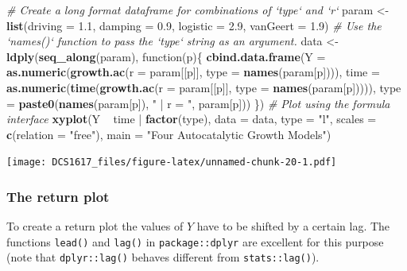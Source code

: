 \documentclass[]{book}
\newenvironment{Shaded}{\begin{snugshade}}{\end{snugshade}}
\newcommand{\KeywordTok}[1]{\textcolor[rgb]{0.13,0.29,0.53}{\textbf{{#1}}}}
\newcommand{\DataTypeTok}[1]{\textcolor[rgb]{0.13,0.29,0.53}{{#1}}}
\newcommand{\FloatTok}[1]{\textcolor[rgb]{0.00,0.00,0.81}{{#1}}}
\newcommand{\StringTok}[1]{\textcolor[rgb]{0.31,0.60,0.02}{{#1}}}
\newcommand{\CommentTok}[1]{\textcolor[rgb]{0.56,0.35,0.01}{\textit{{#1}}}}
\newcommand{\NormalTok}[1]{{#1}}
\begin{document}
\begin{Shaded}
\begin{Highlighting}[]
\CommentTok{# Create a long format dataframe for combinations of `type` and `r`}
\NormalTok{param <-}\StringTok{ }\KeywordTok{list}\NormalTok{(}\DataTypeTok{driving  =} \FloatTok{1.1}\NormalTok{,}
              \DataTypeTok{damping  =} \FloatTok{0.9}\NormalTok{,}
              \DataTypeTok{logistic =} \FloatTok{2.9}\NormalTok{,}
              \DataTypeTok{vanGeert =} \FloatTok{1.9}\NormalTok{)}
\CommentTok{# Use the `names()` function to pass the `type` string as an argument.}
\NormalTok{data <-}\StringTok{ }\KeywordTok{ldply}\NormalTok{(}\KeywordTok{seq_along}\NormalTok{(param), function(p)\{}
    \KeywordTok{cbind.data.frame}\NormalTok{(}\DataTypeTok{Y    =} \KeywordTok{as.numeric}\NormalTok{(}\KeywordTok{growth.ac}\NormalTok{(}\DataTypeTok{r =} \NormalTok{param[[p]], }\DataTypeTok{type =} \KeywordTok{names}\NormalTok{(param[p]))),}
                     \DataTypeTok{time =} \KeywordTok{as.numeric}\NormalTok{(}\KeywordTok{time}\NormalTok{(}\KeywordTok{growth.ac}\NormalTok{(}\DataTypeTok{r =} \NormalTok{param[[p]], }\DataTypeTok{type =} \KeywordTok{names}\NormalTok{(param[p])))),}
                     \DataTypeTok{type =} \KeywordTok{paste0}\NormalTok{(}\KeywordTok{names}\NormalTok{(param[p]), }\StringTok{" | r = "}\NormalTok{, param[p]))}
    \NormalTok{\})}
\CommentTok{# Plot using the formula interface}
\KeywordTok{xyplot}\NormalTok{(Y ~}\StringTok{ }\NormalTok{time |}\StringTok{ }\KeywordTok{factor}\NormalTok{(type), }\DataTypeTok{data =} \NormalTok{data, }\DataTypeTok{type =} \StringTok{"l"}\NormalTok{, }\DataTypeTok{scales =} \KeywordTok{c}\NormalTok{(}\DataTypeTok{relation =} \StringTok{"free"}\NormalTok{),}
       \DataTypeTok{main =} \StringTok{"Four Autocatalytic Growth Models"}\NormalTok{)}
\end{Highlighting}
\end{Shaded}

\texttt{[image: DCS1617\_files/figure-latex/unnamed-chunk-20-1.pdf]}

\subsubsection*{The return plot}\label{the-return-plot-1}

To create a return plot the values of \(Y\) have to be shifted by a
certain lag. The functions \texttt{lead()} and \texttt{lag()} in
\texttt{package::dplyr} are excellent for this purpose (note that
\texttt{dplyr::lag()} behaves different from \texttt{stats::lag()}).
\end{document}
